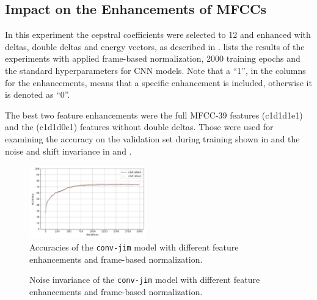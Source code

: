 
\subsection{Impact on the Enhancements of MFCCs}\label{sec:exp_fs_mfcc}
In this experiment the cepstral coefficients were selected to 12 and enhanced with deltas, double deltas and energy vectors, as described in .
 lists the results of the experiments with applied frame-based normalization, 2000 training epochs and the standard hyperparameters for CNN models.
Note that a \enquote{1}, in the columns for the enhancements, means that a specific enhancement is included, otherwise it is denoted as \enquote{0}. 

The best two feature enhancements were the full MFCC-39 features (c1d1d1e1) and the (c1d1d0e1) features without double deltas.
Those were used for examining the accuracy on the validation set during training shown in  and the noise and shift invariance in  and .
\begin{figure}[!ht]
  \centering
  \includegraphics[width=0.45\textwidth]{./5_exp/figs/exp_fs_mfcc_acc_conv-jim.png}
  \caption{Accuracies of the \texttt{conv-jim} model with different feature enhancements and frame-based normalization.}
  \label{fig:exp_fs_mfcc_tb_acc_conv-jim}
\end{figure}
\FloatBarrier
\noindent
\begin{figure}[!ht]
  \centering
  \caption{Noise invariance of the \texttt{conv-jim} model with different feature enhancements and frame-based normalization.}
  \label{fig:exp_fs_mfcc_tb_noise_conv-jim}
\end{figure}
